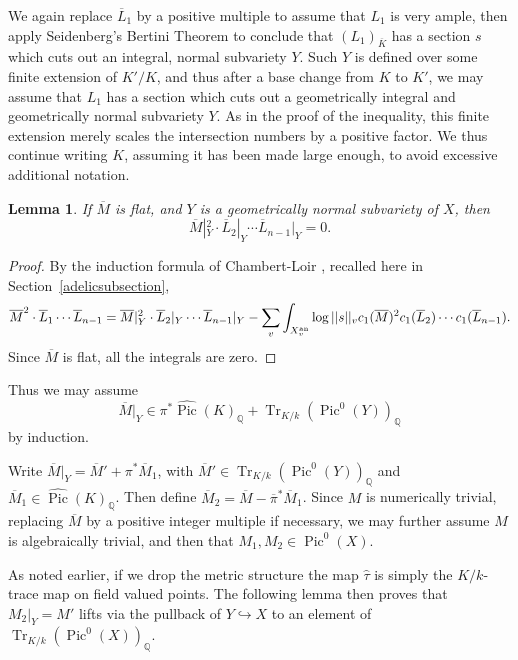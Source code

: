 \documentclass[times, doublespace]{amsart}
\numberwithin{equation}{section}
\theoremstyle{plain}
\newtheorem{lemma}[equation]{Lemma}
\theoremstyle{definition}
\DeclareMathOperator{\Pic}{Pic}
\DeclareMathOperator{\an}{an}
\newcommand{\Tr}{\operatorname{Tr}}
\newcommand{\imP}[1]{\Tr_{K/k}\left(\Pic^0(#1)\right)}
\newcommand{\htau}{\widehat\tau}
\newcommand{\Q}{\mathbb{Q}}
\begin{document}
We again replace $\overline L_1$ by a positive multiple to assume that $L_1$ is very ample, then apply Seidenberg's Bertini Theorem to conclude that $(L_1)_{\overline K}$ has a section $s$ which cuts out an integral, normal subvariety $Y$. Such $Y$ is defined over some finite extension of $K'/K$, and thus after a base change from $K$ to $K'$, we may assume that $L_1$ has a section which cuts out a geometrically integral and geometrically normal subvariety $Y$. As in the proof of the inequality, this finite extension merely scales the intersection numbers by a positive factor. We thus continue writing $K$, assuming it has been made large enough, to avoid excessive additional notation.

\begin{lemma}\label{bertinisection}
If $\overline M$ is flat, and $Y$ is a geometrically normal subvariety of $X$, then
\[\overline M|_Y^2\cdot\overline L_2|_Y\cdots\overline L_{n-1}|_Y=0.\]
\end{lemma}
\begin{proof}
By the induction formula of Chambert-Loir \cite{C-L}, recalled here in Section~\ref{adelicsubsection},
\[
\overline M^2\cdot\overline L_1\cdots \overline L_{n-1}
=\overline M|_{Y}^2\cdot \overline L_2|_{Y}\cdots\overline L_{n-1}|_{Y}\\-\sum_v\int_{X^{\an}_v}\log||s||_vc_1(\overline M)^2c_1(\overline L_2)\cdots c_1(\overline L_{n-1}).
\]
Since $\overline M$ is flat, all the integrals are zero.
\end{proof}

Thus we may assume
\[\overline M|_Y\in\pi^*\widehat{\Pic}(K)_{\Q}+\imP{Y}_{\Q}\]
by induction.


Write $\overline M|_Y=\overline M'+\pi^*\overline M_1$, with $\overline M'\in\imP{Y}_{\Q}$ and $\overline M_1\in\widehat{\Pic}(K)_{\Q}$. Then define $\overline M_2=\overline M-\overline \pi^*\overline M_1$.
Since $M$ is numerically trivial, replacing $\overline M$ by a positive integer multiple if necessary, we may further assume $M$ is algebraically trivial, and then that $M_1,M_2\in\Pic^0(X)$.

As noted earlier, if we drop the metric structure the map $\htau$ is simply the $K/k$-trace map on field valued points. The following lemma then proves that $M_2|_Y=M'$ lifts via the pullback of $Y\hookrightarrow X$ to an element of $\imP{X}_{\Q}$.
\end{document}
